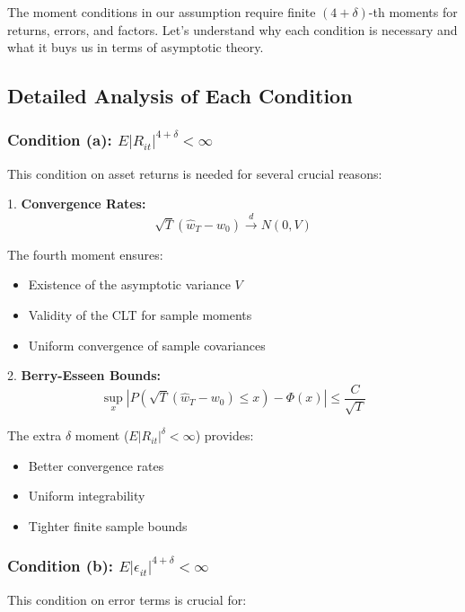 \documentclass[12pt,article]{memoir}
\begin{document}
The moment conditions in our assumption require finite $(4+\delta)$-th moments for returns, errors, and factors. Let's understand why each condition is necessary and what it buys us in terms of asymptotic theory.

\subsection{Detailed Analysis of Each Condition}

\subsubsection{Condition (a): $E|R_{it}|^{4+\delta} < \infty$}

This condition on asset returns is needed for several crucial reasons:

1. \textbf{Convergence Rates:}
\begin{equation}
    \sqrt{T}(\hat{w}_T - w_0) \xrightarrow{d} N(0, V)
\end{equation}

The fourth moment ensures:
\begin{itemize}
    \item Existence of the asymptotic variance $V$
    \item Validity of the CLT for sample moments
    \item Uniform convergence of sample covariances
\end{itemize}

2. \textbf{Berry-Esseen Bounds:}
\begin{equation}
    \sup_x |P(\sqrt{T}(\hat{w}_T - w_0) \leq x) - \Phi(x)| \leq \frac{C}{\sqrt{T}}
\end{equation}

The extra $\delta$ moment ($E|R_{it}|^{\delta} < \infty$) provides:
\begin{itemize}
    \item Better convergence rates
    \item Uniform integrability
    \item Tighter finite sample bounds
\end{itemize}

\subsubsection{Condition (b): $E|\epsilon_{it}|^{4+\delta} < \infty$}

This condition on error terms is crucial for:
\end{document}
